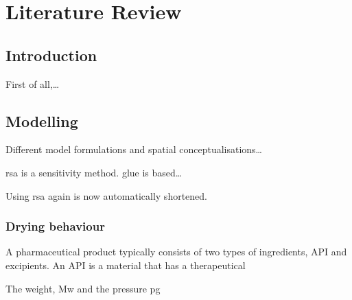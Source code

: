 
\chapter[Literature Review]%
{Literature Review}

\section{Introduction}
First of all,\ldots

\section{Modelling}
Different model formulations and spatial conceptualisations\ldots

rsa is a sensitivity method. glue is based\ldots

Using rsa again is now automatically shortened.

\subsection{Drying behaviour}
A pharmaceutical product typically consists of two types of ingredients, API and excipients. An API is a material that has a therapeutical

The weight, Mw and the pressure pg


